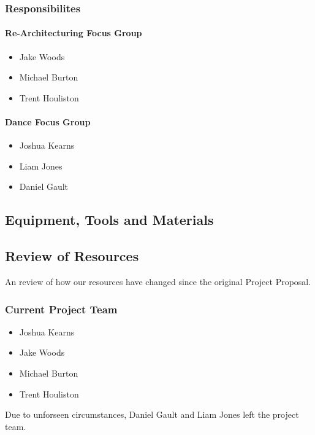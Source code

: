 \documentclass[a4paper]{article}
\begin{document}
			\subsubsection{Responsibilites}
				\paragraph{Re-Architecturing Focus Group}
					\begin{itemize}
						\item Jake Woods
						\item Michael Burton
						\item Trent Houliston
					\end{itemize}
				\paragraph{Dance Focus Group}
					\begin{itemize}
						\item Joshua Kearns
						\item Liam Jones
						\item Daniel Gault
					\end{itemize}
		\subsection{Equipment, Tools and Materials}
		\subsection {Review of Resources}
			An review of how our resources have changed since the original Project Proposal.
			\subsubsection{Current Project Team}
				\begin{itemize}
					\item Joshua Kearns
					\item Jake Woods
					\item Michael Burton
					\item Trent Houliston
				\end{itemize}
				Due to unforseen circumstances, Daniel Gault and Liam Jones left the project team.
\end{document}
